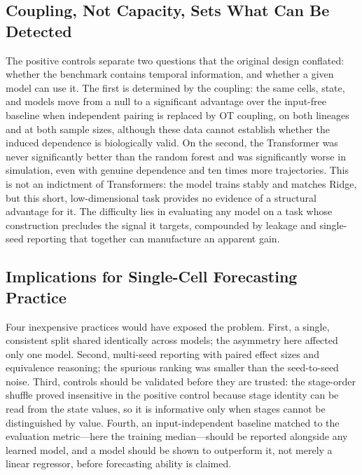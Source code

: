 \documentclass[10pt,journal,compsoc]{IEEEtran}
\begin{document}
\subsection{Coupling, Not Capacity, Sets What Can Be Detected}
The positive controls separate two questions that the original design conflated: whether the benchmark contains temporal information, and whether a given model can use it. The first is determined by the coupling: the same cells, state, and models move from a null to a significant advantage over the input-free baseline when independent pairing is replaced by OT coupling, on both lineages and at both sample sizes, although these data cannot establish whether the induced dependence is biologically valid. On the second, the Transformer was never significantly better than the random forest and was significantly worse in simulation, even with genuine dependence and ten times more trajectories. This is not an indictment of Transformers: the model trains stably and matches Ridge, but this short, low-dimensional task provides no evidence of a structural advantage for it. The difficulty lies in evaluating any model on a task whose construction precludes the signal it targets, compounded by leakage and single-seed reporting that together can manufacture an apparent gain.

\subsection{Implications for Single-Cell Forecasting Practice}
Four inexpensive practices would have exposed the problem. First, a single, consistent split shared identically across models; the asymmetry here affected only one model. Second, multi-seed reporting with paired effect sizes and equivalence reasoning; the spurious ranking was smaller than the seed-to-seed noise. Third, controls should be validated before they are trusted: the stage-order shuffle proved insensitive in the positive control because stage identity can be read from the state values, so it is informative only when stages cannot be distinguished by value. Fourth, an input-independent baseline matched to the evaluation metric---here the training median---should be reported alongside any learned model, and a model should be shown to outperform it, not merely a linear regressor, before forecasting ability is claimed.
\end{document}
